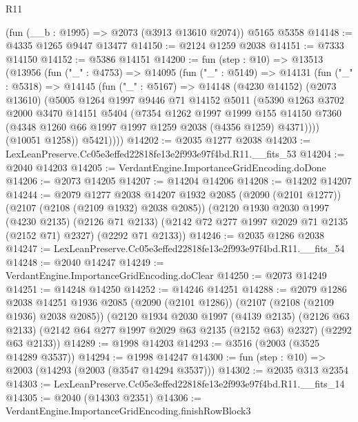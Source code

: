 \begin{lexlean}{R11}
\begin{coremodule}
    (fun (__b : @1995) => @2073 (@3913 @13610 @2074))
    @5165
    @5358
@14148 := @4335 @1265 @9447 @13477
@14150 := @2124 @1259 @2038
@14151 := @7333 @14150
@14152 := @5386 @14151
@14200 := fun (step : @10) =>
  @13513
    (@13956
      (fun ("_" : @4753) =>
      @14095
        (fun ("_" : @5149) =>
        @14131
          (fun ("_" : @5318) =>
          @14145
            (fun ("_" : @5167) =>
            @14148
              (@4230 @14152)
              (@2073 @13610)
              (@5005
                @1264
                @1997
                @9446
                @71
                @14152
                @5011
                (@5390
                  @1263
                  @3702
                  @2000
                  @3470
                  @14151
                  @5404
                  (@7354
                    @1262
                    @1997
                    @1999
                    @155
                    @14150
                    @7360
                    (@4348 @1260 @66 @1997 @1997 @1259 @2038 (@4356 @1259) @4371))))
              (@10051 @1258))
            @5421))))
@14202 := @2035 @1277 @2038
@14203 := LexLeanPreserve.Cc05e3effed22818fe13e2f993e97f4bd.R11.__fits_53
@14204 := @2040 @14203
@14205 := VerdantEngine.ImportanceGridEncoding.doDone
@14206 := @2073 @14205
@14207 := @14204 @14206
@14208 := @14202 @14207
@14244 := @2079
    @1277
    @2038
    @14207
    @1932
    @2085
    (@2090 (@2101 @1277))
    (@2107 (@2108 (@2109 @1932) @2038 @2085))
    (@2120
      @1930
      @2030
      @1997
      (@4230 @2135)
      (@2126 @71 @2133)
      (@2142 @72 @277 @1997 @2029 @71 @2135 (@2152 @71) @2327)
      (@2292 @71 @2133))
@14246 := @2035 @1286 @2038
@14247 := LexLeanPreserve.Cc05e3effed22818fe13e2f993e97f4bd.R11.__fits_54
@14248 := @2040 @14247
@14249 := VerdantEngine.ImportanceGridEncoding.doClear
@14250 := @2073 @14249
@14251 := @14248 @14250
@14252 := @14246 @14251
@14288 := @2079
    @1286
    @2038
    @14251
    @1936
    @2085
    (@2090 (@2101 @1286))
    (@2107 (@2108 (@2109 @1936) @2038 @2085))
    (@2120
      @1934
      @2030
      @1997
      (@4139 @2135)
      (@2126 @63 @2133)
      (@2142 @64 @277 @1997 @2029 @63 @2135 (@2152 @63) @2327)
      (@2292 @63 @2133))
@14289 := @1998 @14203
@14293 := @3516 (@2003 (@3525 @14289 @3537))
@14294 := @1998 @14247
@14300 := fun (step : @10) => @2003 (@14293 (@2003 (@3547 @14294 @3537)))
@14302 := @2035 @313 @2354
@14303 := LexLeanPreserve.Cc05e3effed22818fe13e2f993e97f4bd.R11.__fits_14
@14305 := @2040 (@14303 @2351)
@14306 := VerdantEngine.ImportanceGridEncoding.finishRowBlock3

\end{coremodule}
\end{lexlean}
